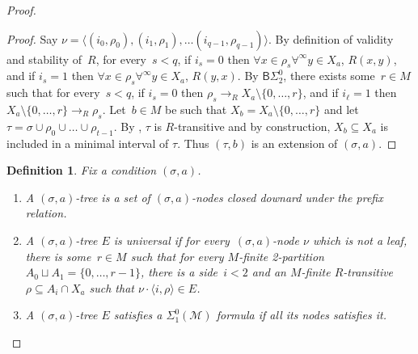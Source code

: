 \documentclass{article}
\numberwithin{theorem}{section}
\newtheorem{lemma}[theorem]{Lemma}
\newtheorem{definition}[theorem]{Definition}
\newcommand{\BSig}{\mathsf{B}\Sigma^0}
\newcommand{\M}{\mathcal{M}}
\begin{document}
\begin{proof}
\begin{proof}
Say $\nu = \langle (i_0, \rho_0), (i_1, \rho_1), \dots (i_{q-1}, \rho_{q-1}) \rangle$.
By definition of validity and stability of~$R$, for every~$s < q$, if $i_s = 0$ then $\forall x \in \rho_s \forall^\infty y \in X_a$, $R(x, y)$, and if $i_s = 1$ then $\forall x \in \rho_s \forall^\infty y \in X_a$, $R(y, x)$.
By $\BSig_2$, there exists some~$r \in M$ such that for every~$s < q$, if $i_s = 0$ then $\rho_s \to_R X_a \setminus \{0, \dots, r\}$, and if $i_\ell = 1$ then $X_a \setminus \{0, \dots, r\} \to_R \rho_s$. Let~$b \in M$ be such that $X_b = X_a \setminus \{0, \dots, r\}$ and let~$\tau = \sigma \cup \rho_0 \cup \dots \cup \rho_{t-1}$.
By , $\tau$ is $R$-transitive and by construction, $X_b \subseteq X_a$ is included in a minimal interval of $\tau$. Thus $(\tau, b)$ is an extension of $(\sigma, a)$.
\end{proof}


\begin{definition}
Fix a condition $(\sigma, a)$.
\begin{enumerate}
    \item[(1)] A \emph{$(\sigma, a)$-tree} is a set of $(\sigma, a)$-nodes closed downard under the prefix relation.
    \item[(2)] A $(\sigma, a)$-tree $E$ is \emph{universal} if for every~$(\sigma,a)$-node $\nu$
    which is not a leaf, there is some~$r \in M$ such that for every $M$-finite 2-partition $A_0 \sqcup A_1 = \{0, \dots, r-1\}$, there is a side~$i < 2$ and an $M$-finite $R$-transitive $\rho \subseteq A_i \cap X_a$ such that $\nu \cdot \langle i, \rho \rangle \in E$.
    \item[(3)] A $(\sigma, a)$-tree $E$ satisfies a $\Sigma^0_1(\M)$ formula if all its nodes satisfies it.
\end{enumerate}
\end{definition}


\end{proof}
\end{document}
